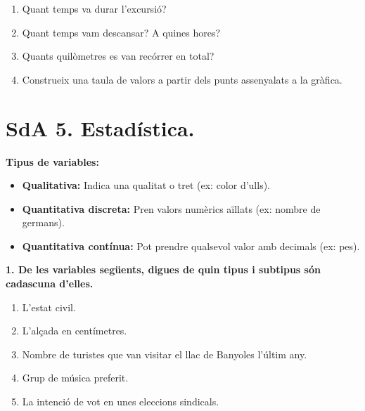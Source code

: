 \documentclass[12pt,a4paper]{article}
\begin{document}
\begin{enumerate}[label=\alph*)]
    \item Quant temps va durar l’excursió? \vspace{1cm}
    \item Quant temps vam descansar? A quines hores? \vspace{1cm}
    \item Quants quilòmetres es van recórrer en total? \vspace{1cm}
    \item Construeix una taula de valors a partir dels punts assenyalats a la gràfica. \vspace{2cm}
\end{enumerate}

\newpage
\section*{SdA 5. Estadística.}

\begin{capsula}
\textbf{Tipus de variables:}
\begin{itemize}[topsep=0pt, itemsep=0pt]
    \item \textbf{Qualitativa:} Indica una qualitat o tret (ex: color d'ulls).
    \item \textbf{Quantitativa discreta:} Pren valors numèrics aïllats (ex: nombre de germans).
    \item \textbf{Quantitativa contínua:} Pot prendre qualsevol valor amb decimals (ex: pes).
\end{itemize}
\end{capsula}

\textbf{1. De les variables següents, digues de quin tipus i subtipus són cadascuna d’elles.}
\begin{enumerate}[label=\alph*)]
    \item L’estat civil. \vspace{0.5cm}
    \item L’alçada en centímetres. \vspace{0.5cm}
    \item Nombre de turistes que van visitar el llac de Banyoles l’últim any. \vspace{0.5cm}
    \item Grup de música preferit. \vspace{0.5cm}
    \item La intenció de vot en unes eleccions sindicals. \vspace{0.5cm}
\end{enumerate}
\end{document}
